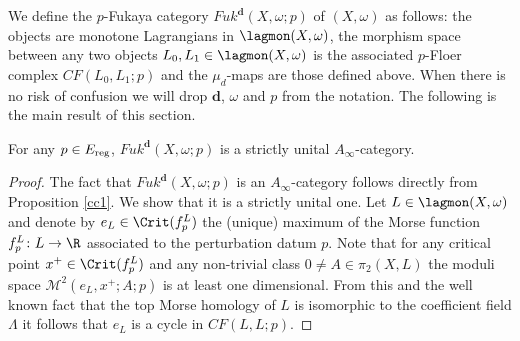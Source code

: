 	We define the $p$-Fukaya category $Fuk^\textbf{d}(X,\omega;p)$ of $(X,\omega)$ as follows: the objects are monotone Lagrangians in $\lagmon(X,\omega)$, the morphism space between any two objects $L_0,L_1\in \lagmon(X,\omega)$ is the associated $p$-Floer complex $CF(L_0,L_1;p)$ and the $\mu_d$-maps are those defined above. When there is no risk of confusion we will drop $\textbf{d}$, $\omega$ and $p$ from the notation.
	The following is the main result of this section. 
	\begin{prop}
		For any $p\in E_\textnormal{reg}$, $Fuk^\mathbf{d}(X,\omega;p)$ is a strictly unital $A_\infty$-category.
	\end{prop}
	\begin{proof}
		The fact that $Fuk^\textbf{d}(X,\omega;p)$ is an $A_\infty$-category follows directly from Proposition \ref{cc1}. We show that it is a strictly unital one. Let $L\in \lagmon(X,\omega)$ and denote by $e_L\in \Crit(f^L_p)$ the (unique) maximum of the Morse function $f^L_p\colon L\to \R$ associated to the perturbation datum $p$. Note that for any critical point $x^+\in \Crit(f^L_p)$ and any non-trivial class $0\neq A\in \pi_2(X,L)$ the moduli space $\mathcal{M}^2(e_L,x^+;A;p)$ is at least one dimensional. From this and the well known fact that the top Morse homology of $L$ is isomorphic to the coefficient field $\Lambda$ it follows that $e_L$ is a cycle in $CF(L,L;p)$.
		

\end{proof}
